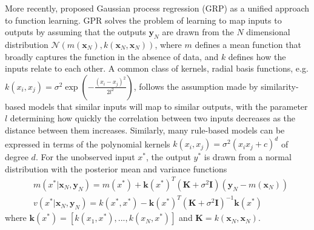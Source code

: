 \documentclass[10pt,letterpaper]{article}
\begin{document}
	More recently, \cite{Lucas} proposed Gaussian process regression (GRP) as a unified approach to function learning. GPR solves the problem of learning to map inputs to outputs by assuming that the outputs $\mathbf{y}_{N}$ are drawn from the $N$ dimensional distribution $\mathcal{N}(m(\mathbf{x}_{N}),k(\mathbf{x}_{N},\mathbf{x}_{N}))$, where $m$ defines a mean function that broadly captures the function in the absence of data, and $k$ defines how the inputs relate to each other. A common class of kernels, radial basis functions, e.g. $k(x_{i},x_{j}) = \sigma^{2}\exp(-\frac{(x_{i}-x_{j})^{2}}{2l^{2}})$, follows the assumption made by similarity-based models that similar inputs will map to similar outputs, with the parameter $l$ determining how quickly the correlation between two inputs decreases as the distance between them increases. Similarly, many rule-based models can be expressed in terms of the polynomial kernels $k(x_{i}, x_{j}) = \sigma^{2} (x_{i}x_{j} + c)^{d}$ of degree $d$. For the unobserved input $x^{*}$, the output $y^{*}$ is drawn from a normal distribution with the posterior mean and variance functions
	\begin{equation}
	\begin{split}
	& m(x^{*} | \mathbf{x}_{N}, \mathbf{y}_{N}) = m(x^{*}) + \mathbf{k}(x^{*})^{T}(\mathbf{K} + \sigma^{2} \mathbf{I}) (\mathbf{y}_{N}-m(\mathbf{x}_{N})) \\
	& v(x^{*} | \mathbf{x}_{N}, \mathbf{y}_{N}) = k(x^{*},x^{*}) - \mathbf{k}(x^{*})^{T}(\mathbf{K} + \sigma^{2} \mathbf{I})^{-1}\mathbf{k}(x^{*})
	\end{split}
	\end{equation}
	 where $\mathbf{k}(x^{*}) = [k(x_{1},x^{*}),...,k(x_{N},x^{*})]$ and $\mathbf{K} = k(\mathbf{x}_{N}, \mathbf{x}_{N})$.
	
\end{document}
